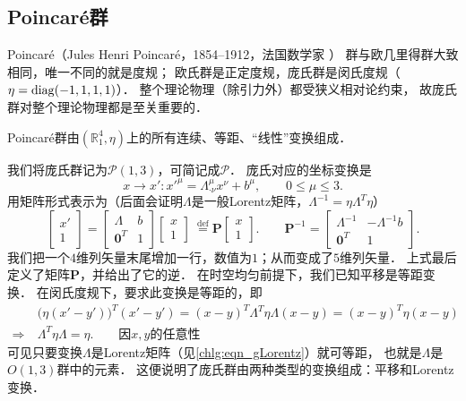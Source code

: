 \subsection{Poincar\'{e}群}\label{chlg:sec_Poincare-group}
Poincar\'{e}（Jules Henri Poincar\'e，1854--1912，法国数学家 ）
群与欧几里得群大致相同，唯一不同的就是度规；
欧氏群是正定度规，庞氏群是闵氏度规（$\eta={\rm diag}(-1,1,1,1)$）．
整个理论物理（除引力外）都受狭义相对论约束，
故庞氏群对整个理论物理都是至关重要的．
\begin{definition}
    Poincar\'{e}群由$(\mathbb{R}^4_1,\eta)$上的所有连续、等距、“线性”变换组成．
\end{definition}
我们将庞氏群记为$\mathcal{P}(1,3)$，可简记成$\mathcal{P}$．
庞氏对应的坐标变换是
\begin{equation}\label{chlg:eqn_xpoincare}
    x\to x' : x'^{\mu} = \Lambda^\mu_{\cdot \nu }x^\nu + b^\mu ,\qquad  0 \leqslant \mu \leqslant 3 .
\end{equation}
用矩阵形式表示为（后面会证明$\Lambda$是一般Lorentz矩阵，$\Lambda^{-1}=\eta \Lambda^T \eta$）
\begin{equation}\label{chlg:eqn_xP5m}
    \begin{bmatrix}  x' \\ 1 \end{bmatrix} =
    \begin{bmatrix}  \Lambda & b \\ \boldsymbol{0}^T & 1  \end{bmatrix}
    \begin{bmatrix}  x \\ 1 \end{bmatrix} 
    \  \overset{\mathrm {def}}{=} \boldsymbol{P} \begin{bmatrix}  x \\ 1 \end{bmatrix} .
    \qquad \boldsymbol{P}^{-1} = 
    \begin{bmatrix}    \Lambda^{-1} & -\Lambda^{-1} b \\ \boldsymbol{0}^T & 1    \end{bmatrix} .
\end{equation}
我们把一个$4$维列矢量末尾增加一行，数值为$1$；从而变成了$5$维列矢量．
上式最后定义了矩阵$\boldsymbol{P}$，并给出了它的逆．
在时空均匀前提下，我们已知平移是等距变换．
在闵氏度规下，要求此变换是等距的，即
    \begin{align*}
        &\bigl(\eta(x'-y')\bigr)^T (x'-y') = ( x - y )^T \Lambda^T \eta \Lambda ( x - y )= (x-y)^T \eta (x-y)\\
        \Rightarrow\ &\Lambda^T \eta \Lambda = \eta .     \qquad \text{因}x,y \text{的任意性}
    \end{align*}
可见只要变换$\Lambda$是Lorentz矩阵（见\eqref{chlg:eqn_gLorentz}）就可等距，
也就是$\Lambda$是$O(1,3)$群中的元素．
这便说明了庞氏群由两种类型的变换组成：平移和Lorentz变换．

